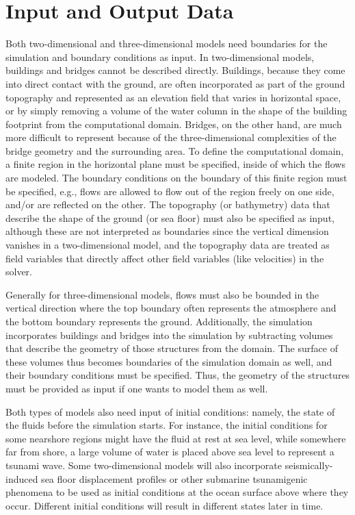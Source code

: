 \section{Input and Output Data}
\label{sec:tsunami_io}

Both two-dimensional and three-dimensional models need boundaries for the simulation and boundary conditions as input. In two-dimensional models, buildings and bridges cannot be described directly.  Buildings, because they come into direct contact with the ground, are often incorporated as part of the ground topography and represented as an elevation field that varies in horizontal space, or by simply removing a volume of the water column in the shape of the building footprint from the computational domain. Bridges, on the other hand, are much more difficult to represent because of the three-dimensional complexities of the bridge geometry and the surrounding area.  To define the computational domain, a finite region in the horizontal plane must be specified, inside of which the flows are modeled. The boundary conditions on the boundary of this finite region must be specified, e.g., flows are allowed to flow out of the region freely on one side, and/or are reflected on the other. The topography (or bathymetry) data that describe the shape of the ground (or sea floor) must also be specified as input, although these are not interpreted as boundaries since the vertical dimension vanishes in a two-dimensional model, and the topography data are treated as field variables that directly affect other field variables (like velocities) in the solver.

Generally for three-dimensional models, flows must also be bounded in the vertical direction where the top boundary often represents the atmosphere and the bottom boundary represents the ground. Additionally, the simulation incorporates buildings and bridges into the simulation by subtracting volumes that describe the geometry of those structures from the domain. The surface of these volumes thus becomes boundaries of the simulation domain as well, and their boundary conditions must be specified. Thus, the geometry of the structures must be provided as input if one wants to model them as well.

Both types of models also need input of initial conditions: namely, the state of the fluids before the simulation starts. For instance, the initial conditions for some nearshore regions might have the fluid at rest at sea level, while somewhere far from shore, a large volume of water is placed above sea level to represent a tsunami wave. Some two-dimensional models will also incorporate seismically-induced sea floor displacement profiles or other submarine tsunamigenic phenomena to be used as initial conditions at the ocean surface above where they occur. Different initial conditions will result in different states later in time.

